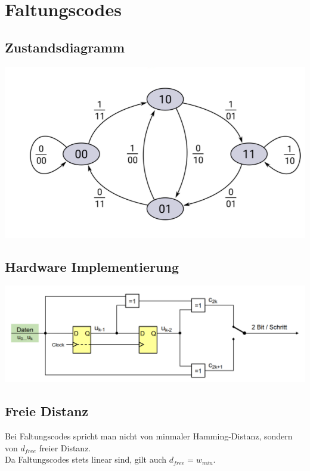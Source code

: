 \section{Faltungscodes}%
\label{sec:faltungscodes}
\subsection{Zustandsdiagramm}%
\label{sub:zustandsdiagramm}

\begin{center}
\includegraphics[width=1\linewidth]{images/zstfal.png}
\end{center}

\subsection{Hardware Implementierung}%
\label{sub:hardware_im}

\begin{center}
\includegraphics[width=1\linewidth]{images/falthard.png}
\end{center}

\subsection{Freie Distanz}%
\label{sub:freie_distanz}
Bei Faltungscodes spricht man nicht von minmaler Hamming-Distanz, sondern von $d_{free}$ freier Distanz.\\
Da Faltungscodes stets linear sind, gilt auch $d_{free}=w_{min}$. \\


